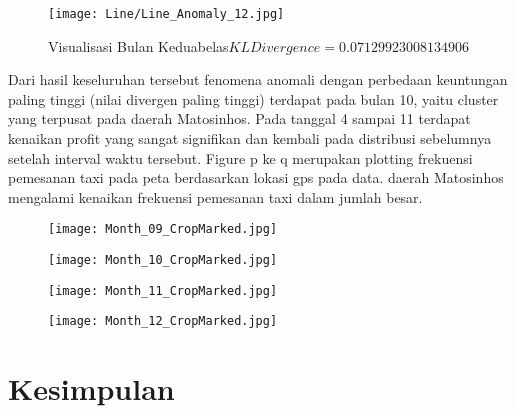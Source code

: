\documentclass{article}
\begin{document}
\begin{figure}[H]
	\centering
	\texttt{[image: Line/Line\_Anomaly\_12.jpg]}
	\caption{Visualisasi Bulan Keduabelas\newline$KL Divergence = 0.07129923008134906$}
\end{figure}

Dari hasil keseluruhan tersebut fenomena anomali dengan  perbedaan keuntungan paling tinggi (nilai divergen paling tinggi) terdapat pada bulan 10, yaitu cluster yang terpusat pada daerah Matosinhos. Pada tanggal 4 sampai 11 terdapat kenaikan profit yang sangat signifikan dan kembali pada distribusi sebelumnya setelah interval waktu tersebut. Figure p ke q merupakan  plotting frekuensi pemesanan taxi pada peta berdasarkan lokasi gps pada data. daerah Matosinhos mengalami kenaikan frekuensi pemesanan taxi dalam jumlah besar.

\begin{figure}[H]
	\centering
	\begin{minipage}{.4\textwidth}
		\centering
		\texttt{[image: Month\_09\_CropMarked.jpg]}
	\end{minipage}%
	\hspace{.1\textwidth}
	\begin{minipage}{.4\textwidth}
		\centering
		\texttt{[image: Month\_10\_CropMarked.jpg]}
	\end{minipage}%
\end{figure}

\begin{figure}[H]
	\centering
	\begin{minipage}{.4\textwidth}
		\centering
		\texttt{[image: Month\_11\_CropMarked.jpg]}
	\end{minipage}%
	\hspace{.1\textwidth}
	\begin{minipage}{.4\textwidth}
		\centering
		\texttt{[image: Month\_12\_CropMarked.jpg]}
	\end{minipage}%
\end{figure}

\section{Kesimpulan}
\end{document}
